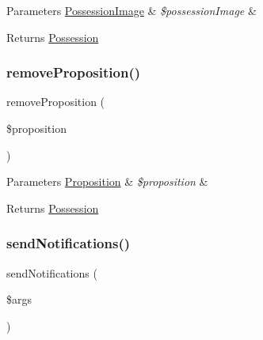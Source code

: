 \begin{DoxyParams}[1]{Parameters}
\mbox{\hyperlink{class_app_1_1_entity_1_1_possession_image}{Possession\+Image}} & {\em \$possession\+Image} & \\
\hline
\end{DoxyParams}
\begin{DoxyReturn}{Returns}
\mbox{\hyperlink{class_app_1_1_entity_1_1_possession}{Possession}} 
\end{DoxyReturn}
\mbox{\label{class_app_1_1_entity_1_1_possession_a58c62b937fc2658f35588927927601f5}} 
\subsubsection{\texorpdfstring{removeProposition()}{removeProposition()}}
{\footnotesize\ttfamily remove\+Proposition (\begin{DoxyParamCaption}\item[{\mbox{\hyperlink{class_app_1_1_entity_1_1_proposition}{Proposition}}}]{\$proposition }\end{DoxyParamCaption})}


\begin{DoxyParams}[1]{Parameters}
\mbox{\hyperlink{class_app_1_1_entity_1_1_proposition}{Proposition}} & {\em \$proposition} & \\
\hline
\end{DoxyParams}
\begin{DoxyReturn}{Returns}
\mbox{\hyperlink{class_app_1_1_entity_1_1_possession}{Possession}} 
\end{DoxyReturn}
\mbox{\label{class_app_1_1_entity_1_1_possession_a2ad56d36f4644ab5c0e4c28470a2ea9b}} 
\subsubsection{\texorpdfstring{sendNotifications()}{sendNotifications()}}
{\footnotesize\ttfamily send\+Notifications (\begin{DoxyParamCaption}\item[{Pre\+Flush\+Event\+Args}]{\$args }\end{DoxyParamCaption})}


